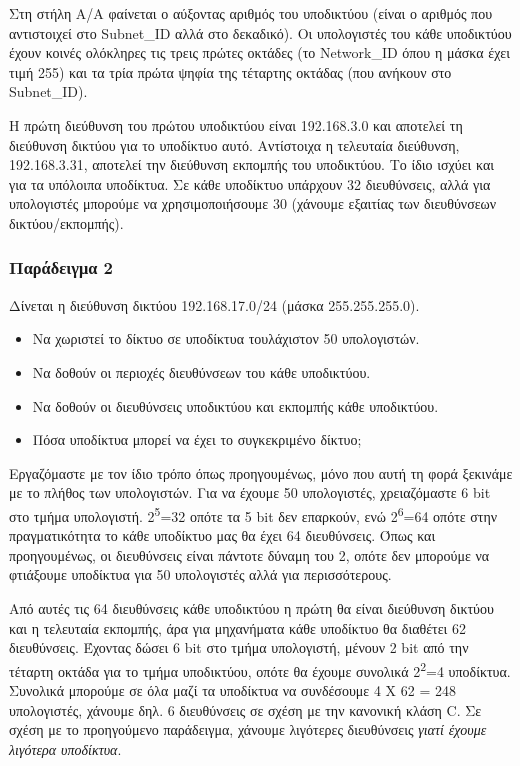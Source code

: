 Στη στήλη Α/Α φαίνεται ο αύξοντας αριθμός του υποδικτύου (είναι ο αριθμός που αντιστοιχεί στο Subnet\_ID αλλά στο δεκαδικό). Οι υπολογιστές του κάθε υποδικτύου έχουν κοινές ολόκληρες τις τρεις πρώτες οκτάδες (το Network\_ID όπου η μάσκα έχει τιμή 255) και τα τρία πρώτα ψηφία της τέταρτης οκτάδας (που ανήκουν στο Subnet\_ID).

Η πρώτη διεύθυνση του πρώτου υποδικτύου είναι 192.168.3.0 και αποτελεί τη διεύθυνση δικτύου για το υποδίκτυο αυτό. Αντίστοιχα η τελευταία διεύθυνση, 192.168.3.31, αποτελεί την διεύθυνση εκπομπής του υποδικτύου. Το ίδιο ισχύει και για τα υπόλοιπα υποδίκτυα. Σε κάθε υποδίκτυο υπάρχουν 32 διευθύνσεις, αλλά για υπολογιστές μπορούμε να χρησιμοποιήσουμε 30 (χάνουμε εξαιτίας των διευθύνσεων δικτύου/εκπομπής).

\subsubsection*{Παράδειγμα 2}

Δίνεται η διεύθυνση δικτύου 192.168.17.0/24 (μάσκα 255.255.255.0). 

\begin{itemize}
\item Να χωριστεί το δίκτυο σε υποδίκτυα τουλάχιστον 50 υπολογιστών.
\item Να δοθούν οι περιοχές διευθύνσεων του κάθε υποδικτύου.
\item Να δοθούν οι διευθύνσεις υποδικτύου και εκπομπής κάθε υποδικτύου.
\item Πόσα υποδίκτυα μπορεί να έχει το συγκεκριμένο δίκτυο;
\end{itemize}

Εργαζόμαστε με τον ίδιο τρόπο όπως προηγουμένως, μόνο που αυτή τη φορά ξεκινάμε με το πλήθος των υπολογιστών. Για να έχουμε 50 υπολογιστές, χρειαζόμαστε 6 bit στο τμήμα υπολογιστή. 2\textsuperscript{5}=32 οπότε τα 5 bit δεν επαρκούν, ενώ 2\textsuperscript{6}=64 οπότε στην πραγματικότητα το κάθε υποδίκτυο μας θα έχει 64 διευθύνσεις. Όπως και προηγουμένως, οι διευθύνσεις είναι πάντοτε δύναμη του 2, οπότε δεν μπορούμε να φτιάξουμε υποδίκτυα για 50 υπολογιστές αλλά για περισσότερους. 

Από αυτές τις 64 διευθύνσεις κάθε υποδικτύου η πρώτη θα είναι διεύθυνση δικτύου και η τελευταία εκπομπής, άρα για μηχανήματα κάθε υποδίκτυο θα διαθέτει 62 διευθύνσεις. Έχοντας δώσει 6 bit στο τμήμα υπολογιστή, μένουν 2 bit από την τέταρτη οκτάδα για το τμήμα υποδικτύου, οπότε θα έχουμε συνολικά 2\textsuperscript{2}=4 υποδίκτυα. Συνολικά μπορούμε σε όλα μαζί τα υποδίκτυα να συνδέσουμε 4 Χ 62 = 248 υπολογιστές, χάνουμε δηλ. 6 διευθύνσεις σε σχέση με την κανονική κλάση C. Σε σχέση με το προηγούμενο παράδειγμα, χάνουμε λιγότερες διευθύνσεις \emph{γιατί έχουμε λιγότερα υποδίκτυα}.

